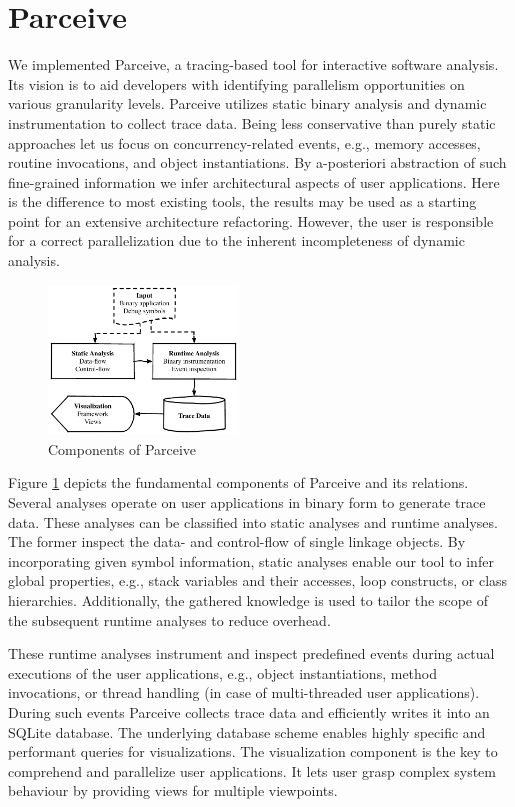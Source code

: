 \section{Parceive}
\label{sec:parceive}
We implemented Parceive, a tracing-based tool for interactive software
analysis. Its vision is to aid developers with identifying parallelism
opportunities on various granularity levels. Parceive utilizes static binary
analysis and dynamic instrumentation to collect trace data. Being less
conservative than purely static approaches let us focus on concurrency-related
events, e.g., memory accesses, routine invocations, and object instantiations.
By a-posteriori abstraction of such fine-grained information we infer
architectural aspects of user applications. Here is the difference to most
existing tools, the results may be used as a starting point for an extensive
architecture refactoring. However, the user is responsible for a correct
parallelization due to the inherent incompleteness of dynamic analysis.

\begin{figure}[h!]
	\begin{center}
		\includegraphics[width=0.45\textwidth]{img/parceive}
		\caption{Components of Parceive}
		\label{fig:parceive_overview}
	\end{center}
\end{figure}

Figure \ref{fig:parceive_overview} depicts the fundamental components of
Parceive and its relations. Several analyses operate on user applications in
binary form to generate trace data. These analyses can be classified into
static analyses and runtime analyses. The former inspect the data- and
control-flow of single linkage objects. By incorporating given symbol
information, static analyses enable our tool to infer global properties, e.g.,
stack variables and their accesses, loop constructs, or class hierarchies.
Additionally, the gathered knowledge is used to tailor the scope of the
subsequent runtime analyses to reduce overhead.

These runtime analyses instrument and inspect predefined events during actual
executions of the user applications, e.g., object instantiations, method
invocations, or thread handling (in case of multi-threaded user applications).
During such events Parceive collects trace data and efficiently writes it into
an SQLite database. The underlying database scheme enables highly specific and
performant queries for visualizations. The visualization component is the key
to comprehend and parallelize user applications. It lets user grasp complex
system behaviour by providing views for multiple viewpoints.